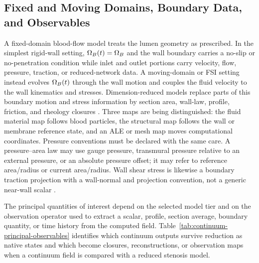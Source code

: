 \subsection{Fixed and Moving Domains, Boundary Data, and Observables}
\label{subsec:continuum-domains-observables}

A fixed-domain blood-flow model treats the lumen geometry as prescribed. In the
simplest rigid-wall setting, $\Omega_B(t)=\Omega_B$ and the wall boundary carries a
no-slip or no-penetration condition while inlet and outlet portions carry
velocity, flow, pressure, traction, or reduced-network data. A moving-domain or
FSI setting instead evolves $\Omega_B(t)$ through the wall motion and couples the
fluid velocity to the wall kinematics and stresses. Dimension-reduced models
replace parts of this boundary motion and stress information by section area,
wall-law, profile, friction, and rheology closures
\cite{KopplHelmig2023DimensionReducedModeling,QuarteroniFormaggia2004CardiovascularModeling}.
Three maps are being distinguished: the fluid material map follows blood
particles, the structural map follows the wall or membrane reference state, and
an ALE or mesh map moves computational coordinates. Pressure conventions must
be declared with the same care. A pressure--area law may use gauge pressure,
transmural pressure relative to an external pressure, or an absolute pressure
offset; it may refer to reference area/radius or current area/radius. Wall
shear stress is likewise a boundary traction projection with a wall-normal and
projection convention, not a generic near-wall scalar
\cite{JohnEtAl2017WallShearStressVectorForm}.

The principal quantities of interest depend on the selected model tier and on
the observation operator used to extract a scalar, profile, section average,
boundary quantity, or time history from the computed field.
Table~\ref{tab:continuum-principal-observables} identifies which continuum
outputs survive reduction as native states and which become closures,
reconstructions, or observation maps when a continuum field is compared with a
reduced stenosis model.

